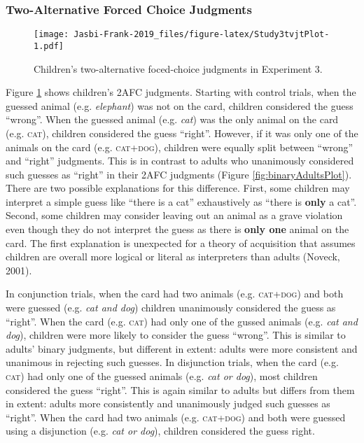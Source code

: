 \documentclass[,man,floatsintext]{apa6}
\begin{document}
\hypertarget{two-alternative-forced-choice-judgments}{%
\subsubsection{Two-Alternative Forced Choice Judgments}\label{two-alternative-forced-choice-judgments}}

\begin{figure}
\centering
\texttt{[image: Jasbi-Frank-2019\_files/figure-latex/Study3tvjtPlot-1.pdf]}
\caption{\label{fig:Study3tvjtPlot}Children's two-alternative foced-choice judgments in Experiment 3.}
\end{figure}

Figure \ref{fig:Study3tvjtPlot} shows children's 2AFC judgments. Starting with control trials, when the guessed animal (e.g. \emph{elephant}) was not on the card, children considered the guess \enquote{wrong}. When the guessed animal (e.g. \emph{cat}) was the only animal on the card (e.g. \textsc{cat}), children considered the guess \enquote{right}. However, if it was only one of the animals on the card (e.g. \textsc{cat+dog}), children were equally split between \enquote{wrong} and \enquote{right} judgments. This is in contrast to adults who unanimously considered such guesses as \enquote{right} in their 2AFC judgments (Figure \ref{fig:binaryAdultsPlot}). There are two possible explanations for this difference. First, some children may interpret a simple guess like \enquote{there is a cat} exhaustively as \enquote{there is \textbf{only} a cat}. Second, some children may consider leaving out an animal as a grave violation even though they do not interpret the guess as there is \textbf{only one} animal on the card. The first explanation is unexpected for a theory of acquisition that assumes children are overall more logical or literal as interpreters than adults (Noveck, 2001).

In conjunction trials, when the card had two animals (e.g. \textsc{cat+dog}) and both were guessed (e.g. \emph{cat and dog}) children unanimously considered the guess as \enquote{right}. When the card (e.g. \textsc{cat}) had only one of the gussed animals (e.g. \emph{cat and dog}), children were more likely to consider the guess \enquote{wrong}. This is similar to adults' binary judgments, but different in extent: adults were more consistent and unanimous in rejecting such guesses. In disjunction trials, when the card (e.g. \textsc{cat}) had only one of the guessed animals (e.g. \emph{cat or dog}), most children considered the guess \enquote{right}. This is again similar to adults but differs from them in extent: adults more consistently and unanimously judged such guesses as \enquote{right}. When the card had two animals (e.g. \textsc{cat+dog}) and both were guessed using a disjunction (e.g. \emph{cat or dog}), children considered the guess right.
\end{document}
